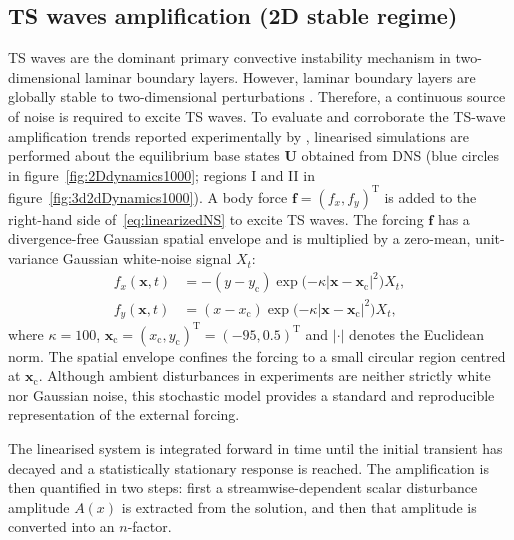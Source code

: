 \documentclass[lineno]{jfm}
\begin{document}
\subsection{\ac{TS} waves amplification (2D stable regime)}\label{sec:2Dstable}
\ac{TS} waves are the dominant primary convective instability mechanism in two-dimensional laminar boundary layers. However, laminar boundary layers are globally stable to two-dimensional perturbations \citep{ehrensteinGallaire2005}. Therefore, a continuous source of noise is required to excite \ac{TS} waves. To evaluate and corroborate the \ac{TS}-wave amplification trends reported experimentally by \citet{jeffGaps}, linearised simulations are performed about the equilibrium base states $\boldsymbol{U}$ obtained from \ac{DNS} (blue circles in figure~\ref{fig:2Ddynamics1000}; regions I and II in figure~\ref{fig:3d2dDynamics1000}). A body force $\boldsymbol{f}={(f_x,f_y)}^\mathrm{T}$ is added to the right-hand side of~\eqref{eq:linearizedNS} to excite \ac{TS} waves. The forcing $\boldsymbol{f}$ has a divergence-free Gaussian spatial envelope and is multiplied by a zero-mean, unit-variance Gaussian white-noise signal $X_t$:
\begin{align}
	f_x(\boldsymbol{x},t) & = -(y-y_{\mathrm{c}}) \exp\big({-\kappa{|\boldsymbol{x}-\boldsymbol{x}_{\mathrm{c}}|}^2}\big) X_t, \\
	f_y(\boldsymbol{x},t) & = (x-x_{\mathrm{c}}) \exp\big({-\kappa{|\boldsymbol{x}-\boldsymbol{x}_{\mathrm{c}}|}^2}\big) X_t,
\end{align}
where $\kappa = 100$, $\boldsymbol{x}_{\mathrm{c}} ={(x_{\mathrm{c}},y_{\mathrm{c}})}^\mathrm{T} = {(-95, 0.5)}^\mathrm{T}$ and $|\cdot|$ denotes the Euclidean norm. The spatial envelope confines the forcing to a small circular region centred at $\boldsymbol{x}_{\mathrm{c}}$. Although ambient disturbances in experiments are neither strictly white nor Gaussian noise, this stochastic model provides a standard and reproducible representation of the external forcing.

The linearised system is integrated forward in time until the initial transient has decayed and a statistically stationary response is reached. The amplification is then quantified in two steps: first a streamwise-dependent scalar disturbance amplitude $A(x)$ is extracted from the solution, and then that amplitude is converted into an $n$-factor.
\end{document}
